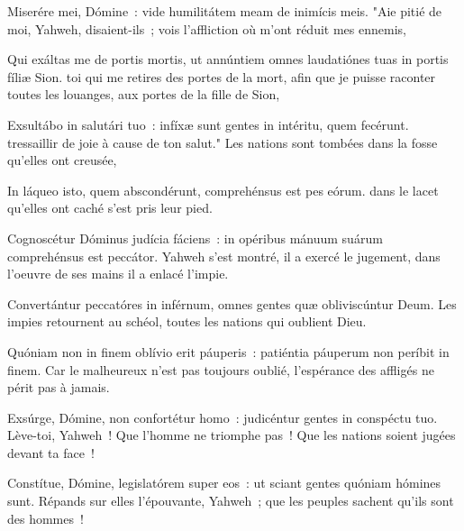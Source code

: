 
\begin{paracol}{2}

    \LigneParacol{0cm}
    {Miserére mei, Dómine~: \GreStar{} vide humilitátem meam de inimícis meis.}
    {"Aie pitié de moi, Yahweh, disaient-ils~; vois l'affliction où m'ont réduit mes ennemis,}

    \LigneParacol{0.2cm}
    {Qui exáltas me de portis mortis, \GreStar{} ut annúntiem omnes laudatiónes tuas in portis fíliæ Sion.}
    {toi qui me retires des portes de la mort, afin que je puisse raconter toutes les louanges, aux portes de la fille de Sion,}

    \LigneParacol{0.2cm}
    {Exsultábo in salutári tuo~: \GreStar{} infíxæ sunt gentes in intéritu, quem fecérunt.}
    {tressaillir de joie à cause de ton salut." Les nations sont tombées dans la fosse qu'elles ont creusée,}

    \LigneParacol{0.2cm}
    {In láqueo isto, quem abscondérunt, \GreStar{} comprehénsus est pes eórum.}
    {dans le lacet qu'elles ont caché s'est pris leur pied.}

    \LigneParacol{0.2cm}
    {Cognoscétur Dóminus judícia fá\-ciens~: \GreStar{} in opéribus mánuum suárum comprehénsus est peccátor.}
    {Yahweh s'est montré, il a exercé le jugement, dans l'oeuvre de ses mains il a enlacé l'impie.}

    \LigneParacol{0.2cm}
    {Convertántur peccatóres in inférnum, \GreStar{} omnes gentes quæ obliviscúntur Deum.}
    {Les impies retournent au schéol, toutes les nations qui oublient Dieu.}

    \LigneParacol{0.2cm}
    {Quóniam non in finem oblívio erit páuperis~: \GreStar{} patiéntia páuperum non períbit in finem.}
    {Car le malheureux n'est pas toujours oublié, l'espérance des affligés ne périt pas à jamais. }

    \LigneParacol{0.2cm}
    {Exsúrge, Dómine, non confortétur homo~: \GreStar{} judicéntur gentes in conspéctu tuo.}
    {Lève-toi, Yahweh~! Que l'homme ne triomphe pas~! Que les nations soient jugées devant ta face~! }

    \LigneParacol{0.2cm}
    {Constítue, Dómine, legislatórem super eos~: \GreStar{} ut sciant gentes quóniam hómines sunt.}
    {Répands sur elles l'épouvante, Yahweh~; que les peuples sachent qu'ils sont des hommes~!}

\end{paracol}
\Gloria
